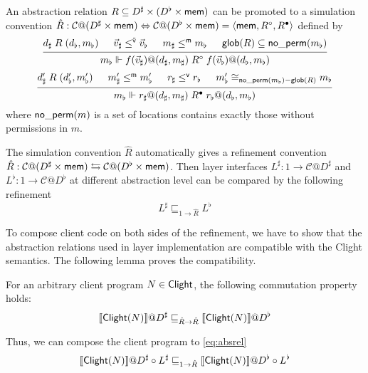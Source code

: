 \documentclass[acmsmall,review,anonymous]{acmart}\settopmatter{printfolios=true,printccs=false,printacmref=false}
\begin{document}
\begin{definition}
  An abstraction relation
  $R \subseteq D^\sharp \times (D^\flat \times  \mathsf{mem} )$
  can be promoted to a simulation convention
  $\hat{R}: \mathcal{C}@(D^\sharp \times  \mathsf{mem} )
  \Leftrightarrow \mathcal{C}@(D^\flat \times  \mathsf{mem} )
  = \langle  \mathsf{mem} , R^\circ, R^\bullet \rangle$
  defined by
  \[
    \begin{prooftree}
      \hypo{d_\sharp \mathrel{R} (d_\flat, m_\flat)}
      \hypo{\vec{v}_\sharp \mathrel{\le^\kw{\vec{v}}} \vec{v}_\flat}
      \hypo{m_\sharp \le^\kw{m} m_\flat}
      \hypo{\kw{glob}(R) \subseteq \kw{no\_perm}(m_\flat)}
      \infer4
      {m_\flat \Vdash
        f(\vec{v}_\sharp)@(d_\sharp, m_\sharp) \mathrel{R^\que}
        f(\vec{v}_\flat)@(d_\flat, m_\flat)}
    \end{prooftree}
  \]
  \[
    \begin{prooftree}
      \hypo{d'_\sharp \mathrel{R} (d'_\flat, m'_\flat)}
      \hypo{m'_\sharp \mathrel{\le^\kw{m}} m'_\flat}
      \hypo{r_\sharp \mathrel{\le^\kw{v}} r_\flat}
      \hypo{m'_\flat \cong_{\kw{no\_perm}(m_\flat) - \kw{glob}(R)} m_\flat}
      \infer4
      {m_\flat \Vdash
        r_\sharp @ (d_\sharp, m_\sharp) \mathrel{R^\ans}r_\flat @ (d_\flat, m_\flat)}
    \end{prooftree}
  \]
  where $ \mathsf{no\_perm} (m)$
  is a set of locations contains exactly
  those without permissions in $m$.
\end{definition}

The simulation convention $\hat{R}$
automatically gives a refinement convention
$\hat{R}: \mathcal{C}@(D^\sharp \times  \mathsf{mem} )
\leftrightarrows \mathcal{C}@(D^\flat \times  \mathsf{mem} )$.
Then layer interfaces
$L^\sharp: 1 \rightarrow \mathcal{C}@D^\sharp$
and $L^\flat: 1 \rightarrow \mathcal{C}@D^\flat$
at different abstraction level
can be compared
by the following refinement
\begin{equation}
  \label{eq:absrel}
  L^\sharp \sqsubseteq_{1 \rightarrow \hat{R}} L^\flat
\end{equation}

To compose client code on both sides of the refinement,
we have to show that
the abstraction relations
used in layer implementation are
compatible with the Clight semantics.
The following lemma proves the compatibility.

\begin{lemma}

For an arbitrary client program $N \in  \mathsf{Clight} $,
the following commutation property holds:
\[
  \llbracket  \mathsf{Clight} (N) \rrbracket @D^\sharp
  \sqsubseteq_{\hat{R} \rightarrow \hat{R}}
  \llbracket  \mathsf{Clight} (N) \rrbracket @D^\flat
\]
\end{lemma}
Thus, we can compose the client program
to \autoref{eq:absrel}
\[
  \llbracket  \mathsf{Clight} (N) \rrbracket @D^\sharp
  \circ L^\sharp
  \sqsubseteq_{1 \rightarrow \hat{R}}
  \llbracket  \mathsf{Clight} (N) \rrbracket @D^\flat
  \circ L^\flat
\]
\end{document}
